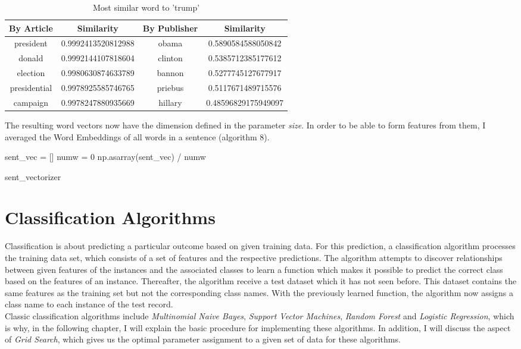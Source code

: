 \documentclass[a4paper, 11pt,titlepage,oneside,openany]{book}
\begin{document}
\begin{table}[t]
	\scriptsize
	\centering
		\begin{tabular}{cc|cc}
			\toprule
			By Article & Similarity  & By Publisher & Similarity \\
			\midrule
			president & 0.9992413520812988 & obama & 0.5890584588050842 \\
			donald & 0.9992144107818604 & clinton & 0.5385712385177612 \\
			election & 0.9980630874633789 & bannon & 0.5277745127677917 \\
			presidential & 0.9978925585746765 & priebus & 0.5117671489715576 \\
			campaign & 0.9978247880935669 & hillary &  0.48596829175949097 \\
			\bottomrule
		\end{tabular}
		\caption{Most similar word to 'trump'}
\end{table}
\noindent The resulting word vectors now have the dimension defined in the parameter \textit{size}. In order to be able to form features from them, I averaged the Word Embeddings of all words in a sentence (algorithm 8).\\
\begin{algorithm}[h]
	\DontPrintSemicolon
	sent\_vec = [] \;
	numw =  0 \;
	\Return np.asarray(sent\_vec) / numw
	\caption{sent\_vectorizer}
\end{algorithm}

\section{Classification Algorithms}
Classification is about predicting a particular outcome based on given training data. For this prediction, a classification algorithm processes the training data set, which consists of a set of features and the respective predictions. The algorithm attempts to discover relationships between given features  of the instances and the associated classes to learn a function which makes it possible to predict the correct class based on the features of an instance. Thereafter, the algorithm receive a test dataset which it has not seen before. This dataset contains the same features as the training set but not the corresponding class names. With the previously learned function, the algorithm now assigns a class name to each instance  of the test record. \\
\noindent Classic classification algorithms include \textit{Multinomial Naive Bayes}, \textit{Support Vector Machines}, \textit{Random Forest} and \textit{Logistic Regression}, which is why, in the following chapter, I will explain the basic procedure for implementing these algorithms. In addition, I will discuss the aspect of \textit{Grid Search}, which gives us the optimal parameter assignment to a given set of data for these algorithms.
\end{document}

